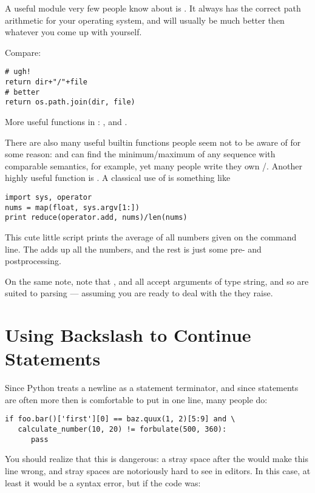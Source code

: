 \documentclass{howto}
\begin{document}
A useful module very few people know about is . It 
always has the correct path arithmetic for your operating system, and
will usually be much better then whatever you come up with yourself.

Compare:

\begin{verbatim}
# ugh!
return dir+"/"+file
# better
return os.path.join(dir, file)
\end{verbatim}

More useful functions in : , 
 and .

There are also many useful builtin functions people seem not to be
aware of for some reason:  and  can
find the minimum/maximum of any sequence with comparable semantics,
for example, yet many people write they own
/. Another highly useful function is
. A classical use of 
is something like

\begin{verbatim}
import sys, operator
nums = map(float, sys.argv[1:])
print reduce(operator.add, nums)/len(nums)
\end{verbatim}

This cute little script prints the average of all numbers given on the
command line. The  adds up all the numbers, and
the rest is just some pre- and postprocessing.

On the same note, note that ,  and
 all accept arguments of type string, and so are
suited to parsing --- assuming you are ready to deal with the
 they raise.

\section{Using Backslash to Continue Statements}

Since Python treats a newline as a statement terminator,
and since statements are often more then is comfortable to put
in one line, many people do:

\begin{verbatim}
if foo.bar()['first'][0] == baz.quux(1, 2)[5:9] and \
   calculate_number(10, 20) != forbulate(500, 360):
      pass
\end{verbatim}

You should realize that this is dangerous: a stray space after the
\code{\\} would make this line wrong, and stray spaces are notoriously
hard to see in editors. In this case, at least it would be a syntax
error, but if the code was:
\end{document}
